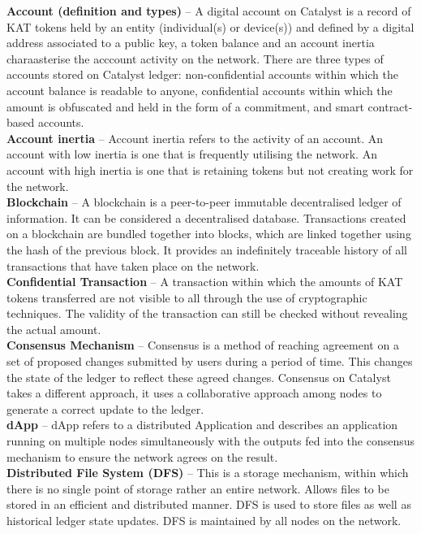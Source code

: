 \textbf{Account (definition and types)} – A digital account on Catalyst is a record of KAT tokens held by an entity (individual(s) or device(s)) and defined by a digital address associated to a public key, a token balance and an account inertia charaasterise the acccount activity on the network.  There are three types of accounts stored on Catalyst ledger: non-confidential accounts within which the account balance is readable to anyone, confidential accounts within which the amount is obfuscated and held in the form of a commitment, and smart contract-based accounts. \\
		
\textbf{Account inertia} – Account inertia refers to the activity of an account. An account with low inertia is one that is frequently utilising the network. An account with high inertia is one that is retaining tokens but not creating work for the network. \\

\textbf{Blockchain} – A blockchain is a peer-to-peer immutable decentralised ledger of information. It can be considered a decentralised database. Transactions created on a blockchain are bundled together into blocks, which are linked together using the hash of the previous block. It provides an indefinitely traceable history of all transactions that have taken place on the network.\\

\textbf{Confidential Transaction} – A transaction within which the amounts of KAT tokens transferred are not visible to all through the use of cryptographic techniques. The validity of the transaction can still be checked without revealing the actual amount. \\

\textbf{Consensus Mechanism} – Consensus is a method of reaching agreement on a set of proposed changes submitted by users during a period of time. This changes the state of the ledger to reflect these agreed changes. Consensus on Catalyst takes a different approach, it uses a collaborative approach among nodes to generate a correct update to the ledger.\\

\textbf{dApp} – dApp refers to a distributed Application and describes an application running on multiple nodes simultaneously with the outputs fed into the consensus mechanism to ensure the network agrees on the result.\\

\textbf{Distributed File System (DFS)} – This is a storage mechanism, within which there is no single point of storage rather an entire network. Allows files to be stored in an efficient and distributed manner. DFS is used to store files as well as historical ledger state updates. DFS is maintained by all nodes on the network. \\

